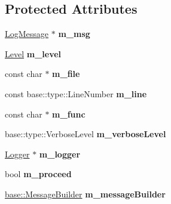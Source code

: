 \subsection*{Protected Attributes}
\begin{DoxyCompactItemize}
\item 
\hypertarget{classel_1_1base_1_1Writer_aad87d889b6ad94bcbf4fd01ca33c47d4}{\hyperlink{classel_1_1LogMessage}{Log\-Message} $\ast$ {\bfseries m\-\_\-msg}}\label{classel_1_1base_1_1Writer_aad87d889b6ad94bcbf4fd01ca33c47d4}

\item 
\hypertarget{classel_1_1base_1_1Writer_a28522bf9b05b4edcc0baf5196645d317}{\hyperlink{namespaceel_ab0ac6091262344c52dd2d3ad099e8e36}{Level} {\bfseries m\-\_\-level}}\label{classel_1_1base_1_1Writer_a28522bf9b05b4edcc0baf5196645d317}

\item 
\hypertarget{classel_1_1base_1_1Writer_a1eada1175721ba11b4eb6c9515d8e2dc}{const char $\ast$ {\bfseries m\-\_\-file}}\label{classel_1_1base_1_1Writer_a1eada1175721ba11b4eb6c9515d8e2dc}

\item 
\hypertarget{classel_1_1base_1_1Writer_aae6f7c08c2617a5ba1ffc38d4eb53207}{const base\-::type\-::\-Line\-Number {\bfseries m\-\_\-line}}\label{classel_1_1base_1_1Writer_aae6f7c08c2617a5ba1ffc38d4eb53207}

\item 
\hypertarget{classel_1_1base_1_1Writer_a57291e0751fe93547d9d5551fb3e8415}{const char $\ast$ {\bfseries m\-\_\-func}}\label{classel_1_1base_1_1Writer_a57291e0751fe93547d9d5551fb3e8415}

\item 
\hypertarget{classel_1_1base_1_1Writer_a335803052b6878c058a4a888279df04d}{base\-::type\-::\-Verbose\-Level {\bfseries m\-\_\-verbose\-Level}}\label{classel_1_1base_1_1Writer_a335803052b6878c058a4a888279df04d}

\item 
\hypertarget{classel_1_1base_1_1Writer_a0fab2e9a168b7973bcca4574d05490d2}{\hyperlink{classel_1_1Logger}{Logger} $\ast$ {\bfseries m\-\_\-logger}}\label{classel_1_1base_1_1Writer_a0fab2e9a168b7973bcca4574d05490d2}

\item 
\hypertarget{classel_1_1base_1_1Writer_a238593eda90cf32645c4541e738bea9a}{bool {\bfseries m\-\_\-proceed}}\label{classel_1_1base_1_1Writer_a238593eda90cf32645c4541e738bea9a}

\item 
\hypertarget{classel_1_1base_1_1Writer_a63763a047d595271cb14f9a80430306b}{\hyperlink{classel_1_1base_1_1MessageBuilder}{base\-::\-Message\-Builder} {\bfseries m\-\_\-message\-Builder}}\label{classel_1_1base_1_1Writer_a63763a047d595271cb14f9a80430306b}


\end{DoxyCompactItemize}

